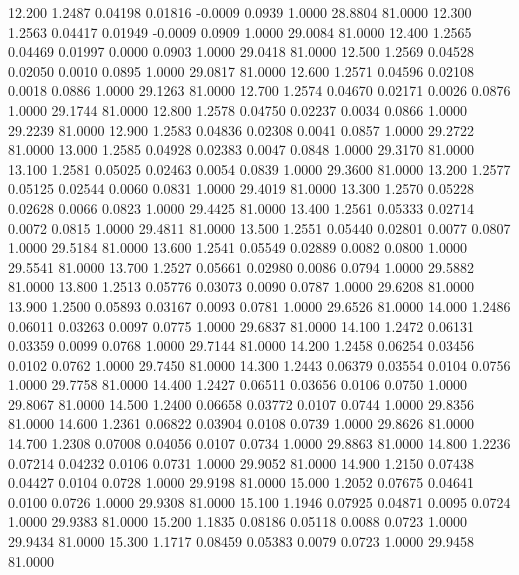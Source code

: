   12.200   1.2487   0.04198   0.01816  -0.0009   0.0939   1.0000  28.8804  81.0000
  12.300   1.2563   0.04417   0.01949  -0.0009   0.0909   1.0000  29.0084  81.0000
  12.400   1.2565   0.04469   0.01997   0.0000   0.0903   1.0000  29.0418  81.0000
  12.500   1.2569   0.04528   0.02050   0.0010   0.0895   1.0000  29.0817  81.0000
  12.600   1.2571   0.04596   0.02108   0.0018   0.0886   1.0000  29.1263  81.0000
  12.700   1.2574   0.04670   0.02171   0.0026   0.0876   1.0000  29.1744  81.0000
  12.800   1.2578   0.04750   0.02237   0.0034   0.0866   1.0000  29.2239  81.0000
  12.900   1.2583   0.04836   0.02308   0.0041   0.0857   1.0000  29.2722  81.0000
  13.000   1.2585   0.04928   0.02383   0.0047   0.0848   1.0000  29.3170  81.0000
  13.100   1.2581   0.05025   0.02463   0.0054   0.0839   1.0000  29.3600  81.0000
  13.200   1.2577   0.05125   0.02544   0.0060   0.0831   1.0000  29.4019  81.0000
  13.300   1.2570   0.05228   0.02628   0.0066   0.0823   1.0000  29.4425  81.0000
  13.400   1.2561   0.05333   0.02714   0.0072   0.0815   1.0000  29.4811  81.0000
  13.500   1.2551   0.05440   0.02801   0.0077   0.0807   1.0000  29.5184  81.0000
  13.600   1.2541   0.05549   0.02889   0.0082   0.0800   1.0000  29.5541  81.0000
  13.700   1.2527   0.05661   0.02980   0.0086   0.0794   1.0000  29.5882  81.0000
  13.800   1.2513   0.05776   0.03073   0.0090   0.0787   1.0000  29.6208  81.0000
  13.900   1.2500   0.05893   0.03167   0.0093   0.0781   1.0000  29.6526  81.0000
  14.000   1.2486   0.06011   0.03263   0.0097   0.0775   1.0000  29.6837  81.0000
  14.100   1.2472   0.06131   0.03359   0.0099   0.0768   1.0000  29.7144  81.0000
  14.200   1.2458   0.06254   0.03456   0.0102   0.0762   1.0000  29.7450  81.0000
  14.300   1.2443   0.06379   0.03554   0.0104   0.0756   1.0000  29.7758  81.0000
  14.400   1.2427   0.06511   0.03656   0.0106   0.0750   1.0000  29.8067  81.0000
  14.500   1.2400   0.06658   0.03772   0.0107   0.0744   1.0000  29.8356  81.0000
  14.600   1.2361   0.06822   0.03904   0.0108   0.0739   1.0000  29.8626  81.0000
  14.700   1.2308   0.07008   0.04056   0.0107   0.0734   1.0000  29.8863  81.0000
  14.800   1.2236   0.07214   0.04232   0.0106   0.0731   1.0000  29.9052  81.0000
  14.900   1.2150   0.07438   0.04427   0.0104   0.0728   1.0000  29.9198  81.0000
  15.000   1.2052   0.07675   0.04641   0.0100   0.0726   1.0000  29.9308  81.0000
  15.100   1.1946   0.07925   0.04871   0.0095   0.0724   1.0000  29.9383  81.0000
  15.200   1.1835   0.08186   0.05118   0.0088   0.0723   1.0000  29.9434  81.0000
  15.300   1.1717   0.08459   0.05383   0.0079   0.0723   1.0000  29.9458  81.0000

